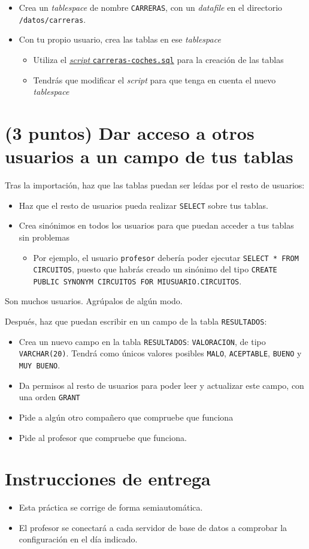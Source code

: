 \documentclass[a4paper]{article}
\begin{document}
\begin{itemize}
\item Crea un \emph{tablespace} de nombre \texttt{CARRERAS}, con un \emph{datafile} en el directorio \texttt{/datos/carreras}.
\item Con tu propio usuario, crea las tablas en ese \emph{tablespace}
\begin{itemize}
\item Utiliza el \href{https://raw.githubusercontent.com/alvarogonzalezsotillo/apuntes-clase/gh-pages/sistemas-gestores-bbdd-asir2/apuntes/1/sql/carreras-coches.sql}{\emph{script} \texttt{carreras-coches.sql}} para la creación de las tablas
\item Tendrás que modificar el \emph{script} para que tenga en cuenta el nuevo \emph{tablespace}
\end{itemize}
\end{itemize}

\section{(3 puntos) Dar acceso a otros usuarios a un campo de tus tablas}
\label{sec:org000000f}
Tras la importación, haz que las tablas puedan ser leídas por el resto de usuarios:
\begin{itemize}
\item Haz que el resto de usuarios pueda realizar \texttt{SELECT} sobre tus tablas.
\item Crea sinónimos en todos los usuarios para que puedan acceder a tus tablas sin problemas
\begin{itemize}
\item Por ejemplo, el usuario \texttt{profesor} debería poder ejecutar \texttt{SELECT * FROM CIRCUITOS}, puesto que habrás creado un sinónimo del tipo \texttt{CREATE PUBLIC SYNONYM CIRCUITOS FOR MIUSUARIO.CIRCUITOS}.
\end{itemize}
\end{itemize}

\begin{Aviso}
Son muchos usuarios. Agrúpalos de algún modo.
\end{Aviso}

Después, haz que puedan escribir en un campo de la tabla \texttt{RESULTADOS}:
\begin{itemize}
\item Crea un nuevo campo en la tabla \texttt{RESULTADOS}: \texttt{VALORACION}, de tipo \texttt{VARCHAR(20)}. Tendrá como únicos valores posibles \texttt{MALO}, \texttt{ACEPTABLE}, \texttt{BUENO} y \texttt{MUY BUENO}.
\item Da permisos al resto de usuarios para poder leer y actualizar este campo, con una orden \texttt{GRANT}
\item Pide a algún otro compañero que compruebe que funciona
\item Pide al profesor que compruebe que funciona.
\end{itemize}

\section*{Instrucciones de entrega}
\label{sec:org0000012}
\begin{itemize}
\item Esta práctica se corrige de forma semiautomática.
\item El profesor se conectará a cada servidor de base de datos a comprobar la configuración en el día indicado.
\end{itemize}
\end{document}
